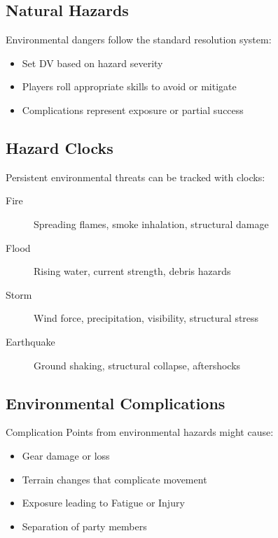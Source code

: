 \subsection{Natural Hazards}

Environmental dangers follow the standard resolution system:
\begin{itemize}
\item Set DV based on hazard severity
\item Players roll appropriate skills to avoid or mitigate
\item Complications represent exposure or partial success
\end{itemize}

\subsection{Hazard Clocks}

Persistent environmental threats can be tracked with clocks:
\begin{description}
\item[Fire] Spreading flames, smoke inhalation, structural damage
\item[Flood] Rising water, current strength, debris hazards
\item[Storm] Wind force, precipitation, visibility, structural stress
\item[Earthquake] Ground shaking, structural collapse, aftershocks
\end{description}

\subsection{Environmental Complications}

Complication Points from environmental hazards might cause:
\begin{itemize}
\item Gear damage or loss
\item Terrain changes that complicate movement
\item Exposure leading to Fatigue or Injury
\item Separation of party members
\end{itemize}
